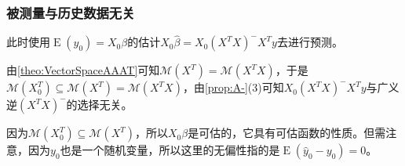 \subsubsection{被测量与历史数据无关}
\begin{derivation}
	此时使用$\operatorname{E}(y_0)=X_0\beta$的估计$X_0\hat{\beta}=X_0(X^TX)^-X^Ty$去进行预测。\par
	由\cref{theo:VectorSpaceAAAT}可知$\mathcal{M}(X^T)=\mathcal{M}(X^TX)$，于是$\mathcal{M}(X_0^T)\subseteq\mathcal{M}(X^T)=\mathcal{M}(X^TX)$，由\cref{prop:A-}(3)可知$X_0(X^TX)^-X^Ty$与广义逆$(X^TX)^-$的选择无关。\par
	因为$\mathcal{M}(X_0^T)\subseteq\mathcal{M}(X^T)$，所以$X_0\beta$是可估的，它具有可估函数的性质。但需注意，因为$y_0$也是一个随机变量，所以这里的无偏性指的是$\operatorname{E}(\hat{y}_0-y_0)=0$。
\end{derivation}
